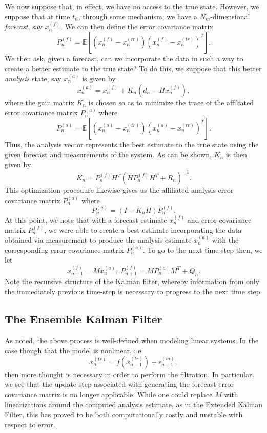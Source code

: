 We now suppose that, in effect, we have no access to the true state.  However, we suppose that at time $t_{n}$, through some mechanism, we have a $N_{m}$-dimensional {\it forecast}, say $x^{(f)}_{n}$.  We can then define the error covariance matrix 
\[
P^{(f)}_{n} = \mathbb{E}\left[\left(x^{(f)}_{n} - x^{(tr)}_{n}\right)\left(x^{(f)}_{n} - x^{(tr)}_{n}\right)^{T} \right].
\]
We then ask, given a forecast, can we incorporate the data in such a way to create a better estimate to the true state?  To do this, we suppose that this better {\it analysis} state, say $x^{(a)}_{n}$ is given by 
\[
x^{(a)}_{n} = x^{(f)}_{n} + K_{n}(d_{n} - Hx^{(f)}_{n}),
\]
where the gain matrix $K_{n}$ is chosen so as to minimize the trace of the affiliated error covariance matrix $P^{(a)}_{n}$ where
\[
P^{(a)}_{n} = \mathbb{E}\left[\left(x^{(a)}_{n} - x^{(tr)}_{n}\right)\left(x^{(a)}_{n} - x^{(tr)}_{n}\right)^{T} \right].
\]
Thus, the analysis vector represents the best estimate to the true state using the given forecast and measurements of the system.  As can be shown, $K_{n}$ is then given by 
\[
K_{n} = P^{(f)}_{n}H^{T}\left(HP^{(f)}_{n}H^{T} + R_{n} \right)^{-1}.
\]
This optimization procedure likewise gives us the affiliated analysis error covariance matrix $P^{(a)}_{n}$ where
\[
P^{(a)}_{n} = (I-K_{n}H)P^{(f)}_{n}.
\]
At this point, we note that with a forecast estimate $x^{(f)}_{n}$ and error covariance matrix $P^{(f)}_{n}$, we were able to create a best estimate incorporating the data obtained via measurement to produce the analysis estimate $x^{(a)}_{n}$ with the corresponding error covariance matrix $P^{(a)}_{n}$.  To go to the next time step then, we let
\[
x^{(f)}_{n+1} = Mx^{(a)}_{n}, ~ P_{n+1}^{(f)} = MP^{(a)}_{n}M^{T} + Q_{n}.
\]
Note the recursive structure of the Kalman filter, whereby information from only the immediately previous time-step is necessary to progress to the next time step.  

\subsection*{The Ensemble Kalman Filter}
As noted, the above process is well-defined when modeling linear systems.  In the case though that the model is nonlinear, i.e.
\[
x^{(tr)}_{n} = f\left(x^{(tr)}_{n-1}\right) + \epsilon^{(m)}_{n-1},
\]
then more thought is necessary in order to perform the filtration.  In particular, we see that the update step associated with generating the forecast error covariance matrix is no longer applicable.  While one could replace $M$ with linearizations around the computed analysis estimate, as in the Extended Kalman Filter, this has proved to be both computationally costly and unstable with respect to error.  


